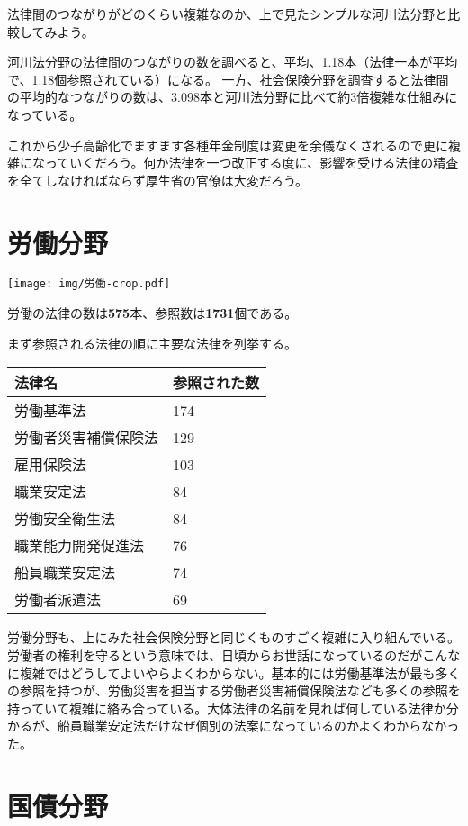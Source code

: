 \documentclass[a5j,openany,twoside]{jsbook}
\begin{document}
法律間のつながりがどのくらい複雑なのか、上で見たシンプルな河川法分野と比較してみよう。

河川法分野の法律間のつながりの数を調べると、平均、1.18本（法律一本が平均で、1.18個参照されている）になる。
一方、社会保険分野を調査すると法律間の平均的なつながりの数は、3.098本と河川法分野に比べて約3倍複雑な仕組みになっている。

これから少子高齢化でますます各種年金制度は変更を余儀なくされるので更に複雑になっていくだろう。何か法律を一つ改正する度に、影響を受ける法律の精査を全てしなければならず厚生省の官僚は大変だろう。

\section{労働分野}

\texttt{[image: img/労働-crop.pdf]}

労働の法律の数は\textbf{575}本、参照数は\textbf{1731}個である。

まず参照される法律の順に主要な法律を列挙する。

\begin{table}[htb]
  \begin{tabular}{|l|l|}  \hline
法律名 & 参照された数 \\ \hline \hline
労働基準法 & 174 \\
労働者災害補償保険法 & 129 \\
雇用保険法 & 103 \\
職業安定法 & 84 \\
労働安全衛生法 & 84 \\
職業能力開発促進法 & 76 \\
船員職業安定法 & 74 \\
労働者派遣法 & 69 \\ \hline
  \end{tabular}
\end{table}

労働分野も、上にみた社会保険分野と同じくものすごく複雑に入り組んでいる。労働者の権利を守るという意味では、日頃からお世話になっているのだがこんなに複雑ではどうしてよいやらよくわからない。基本的には労働基準法が最も多くの参照を持つが、労働災害を担当する労働者災害補償保険法なども多くの参照を持っていて複雑に絡み合っている。大体法律の名前を見れば何している法律か分かるが、船員職業安定法だけなぜ個別の法案になっているのかよくわからなかった。

\clearpage


\section{国債分野}
\end{document}
